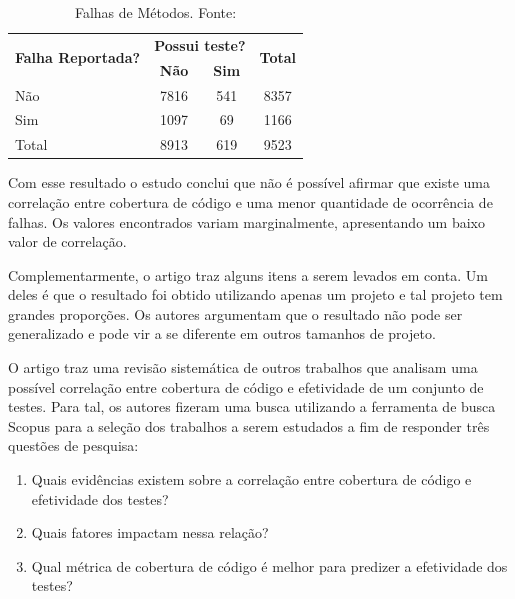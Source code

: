 \documentclass[11.5pt]{article}
\begin{document}
\begin{table}[ht]
\centering
\caption{Falhas de Métodos. Fonte: \cite{unitTestedCrash}}
\label{tab:FalhasMetodosTeste}
\begin{tabular}{|l|c|c|c|}
\hline
\multirow{2}{*}{\textbf{Falha Reportada?}} & \multicolumn{2}{c|}{\textbf{Possui teste?}} & \multirow{2}{*}{\textbf{Total}} \\ \cline{2-3}
                                  & \textbf{Não}   & \textbf{Sim}                        &       \\ \hline
Não                               & 7816  & 541                        & 8357  \\ \hline
Sim                               & 1097  &  69                        & 1166  \\ \hline \hline
Total                             & 8913  & 619                        & 9523  \\ \hline
\end{tabular}
\end{table}

Com esse resultado o estudo conclui que não é possível afirmar que existe uma correlação entre
cobertura de código e uma menor quantidade de ocorrência de falhas. Os valores encontrados variam
marginalmente, apresentando um baixo valor de correlação.

Complementarmente, o artigo traz alguns itens a serem levados em conta.
Um deles é que o resultado foi obtido utilizando apenas um projeto e tal projeto tem grandes
proporções.
Os autores argumentam que o resultado não pode ser generalizado e pode vir a se diferente em outros
tamanhos de projeto.

O artigo \cite{coverageMetaAnalysis} traz uma revisão sistemática de outros trabalhos que analisam
uma possível correlação entre cobertura de código e efetividade de um conjunto de testes.
Para tal, os autores fizeram uma busca utilizando a ferramenta de busca Scopus para a seleção dos
trabalhos a serem estudados a fim de responder três questões de pesquisa:
\begin{enumerate}
    \item Quais evidências existem sobre a correlação entre cobertura de código e efetividade dos
          testes?

    \item Quais fatores impactam nessa relação?

    \item Qual métrica de cobertura de código é melhor para predizer a efetividade dos testes?
\end{enumerate}
\end{document}
